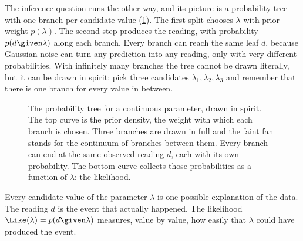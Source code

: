 The inference question runs the other way, and its picture is a probability tree with
one branch per candidate value (\cref{5b:fig:tree}). The first split chooses $\lambda$
with prior weight $p(\lambda)$. The second step produces the reading, with probability
$p(d\given\lambda)$ along each branch. Every branch can reach the same leaf $d$,
because Gaussian noise can turn any prediction into any reading, only with very
different probabilities. With infinitely many branches the tree cannot be drawn
literally, but it can be drawn in spirit: pick three candidates $\lambda_1,\lambda_2,
\lambda_3$ and remember that there is one branch for every value in between.

\begin{figure}[htbp]
\centering
{}
\caption{The probability tree for a continuous parameter, drawn in spirit. The top
curve is the prior density, the weight with which each branch is chosen. Three branches
are drawn in full and the faint fan stands for the continuum of branches between them.
Every branch can end at the same observed reading $d$, each with its own probability.
The bottom curve collects those probabilities as a function of $\lambda$: the
likelihood.}
\label{5b:fig:tree}
\end{figure}

\begin{keyidea}
Every candidate value of the parameter $\lambda$ is one possible explanation of
the data. The reading $d$ is the event that actually happened. The likelihood
$\Like(\lambda)=p(d\given\lambda)$ measures, value by value, how easily that
$\lambda$ could have produced the event.
\end{keyidea}

